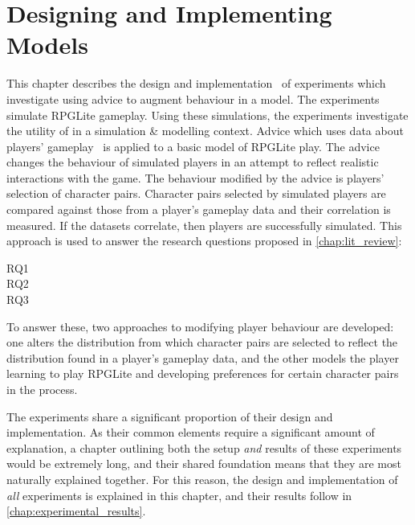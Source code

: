 \chapter{Designing and Implementing \AspectOriented{} Models}
\label{chap:exp1_simulation_optimisation}
\label{chap:experiment_setup}


This chapter describes the design and
implementation~\cite{rpglite_analysis_and_experiments_repo} of experiments which
investigate using advice to augment behaviour in a model. The experiments
simulate RPGLite gameplay. Using these simulations, the experiments investigate
the utility of \aop{} in a simulation \& modelling context. Advice which uses
data about players' gameplay~\cite{rpglite_dataset} is applied to a basic model
of RPGLite play. The advice changes the behaviour of simulated players in an
attempt to reflect realistic interactions with the game. The behaviour modified
by the advice is players' selection of character pairs. Character pairs selected
by simulated players are compared against those from a player's gameplay data
and their correlation is measured. If the datasets correlate, then players are
successfully simulated. This approach is used to answer the research questions
proposed in \cref{chap:lit_review}: 

\begin{researchquestion}
  \begin{description}
   \item[RQ1] \rqone{}
   \item[RQ2] \rqtwo{}
   \item[RQ3] \rqthree{}
  \end{description}
\end{researchquestion}

To answer these, two approaches to modifying player behaviour are developed:
one alters the distribution from which character pairs are selected to reflect
the distribution found in a player's gameplay data, 
and the other models the player learning to play RPGLite and developing
preferences for certain character pairs in the process.

The experiments share a significant proportion of their design and
implementation. As their common elements require a significant amount of
explanation, a chapter outlining both the setup \emph{and} results of these
experiments would be extremely long, and their shared foundation means that they
are most naturally explained together. For this reason, the design and
implementation of \emph{all} experiments is explained in this chapter, and their
results follow in \cref{chap:experimental_results}.

